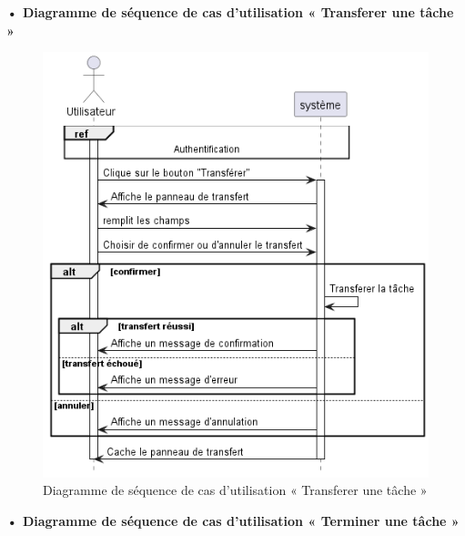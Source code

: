 \textbf{•	Diagramme de séquence de cas d'utilisation « Transferer une tâche  »}
\begin{figure}[H]
  \centering
  \includegraphics[width=1\textwidth]{out/diagrams/documents/transfer_task/transfer_task}
  \caption{Diagramme de séquence de cas d'utilisation « Transferer une tâche  »}
  \label{fig:sequence_transfer_task}
\end{figure}
\textbf{•	Diagramme de séquence de cas d'utilisation « Terminer une tâche  »}
